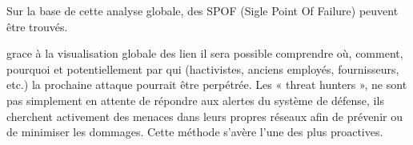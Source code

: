 Sur la base de cette analyse globale, des SPOF (Sigle Point Of Failure) peuvent être trouvés. 

grace à la visualisation  globale des lien il sera possible comprendre où, comment, pourquoi et potentiellement par qui (hactivistes, anciens employés, fournisseurs, etc.) la prochaine attaque pourrait être perpétrée. 
Les « threat hunters », ne sont pas simplement en attente de répondre aux alertes du système de défense, ils cherchent activement des menaces dans leurs propres réseaux afin de prévenir ou de minimiser les dommages. Cette méthode s’avère l’une des plus proactives. 


